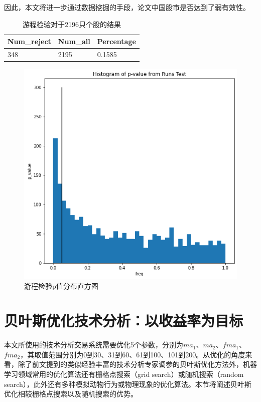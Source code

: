 \documentclass[twoside,longtitle]{LZUthesis}
\begin{document}
因此，本文将进一步通过数据挖掘的手段，论文中国股市是否达到了弱有效性。


\begin{table}[]
\centering
\begin{tabular}{lll}
\hline
Num\_reject & Num\_all & Percentage \\\hline
348         & 2195              & 0.1585 \\\hline
\end{tabular}
\caption{游程检验对于2196只个股的结果}
\end{table}

\begin{figure}
    \centering
    \includegraphics[scale=0.7]{fig5-1.png}
    \caption{游程检验p值分布直方图}
    \label{fig:my_label}
\end{figure}


\section{贝叶斯优化技术分析：以收益率为目标}

本文所使用的技术分析交易系统需要优化5个参数，分别为$ma_1$、$ma_2$、$fma_1$、$fma_2$，其取值范围分别为0到30、31到60、61到100、101到200。从优化的角度来看，除了前文提到的类似经验丰富的技术分析专家调参的贝叶斯优化方法外，机器学习领域常用的优化算法还有栅格点搜索（grid search）或随机搜索（random search），此外还有多种模拟动物行为或物理现象的优化算法。本节将阐述贝叶斯优化相较栅格点搜索以及随机搜索的优势。
\end{document}
